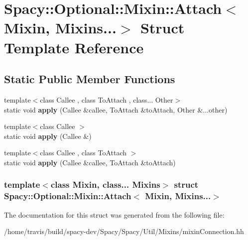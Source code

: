\hypertarget{structSpacy_1_1Optional_1_1Mixin_1_1Attach_3_01Mixin_00_01Mixins_8_8_8_4}{\section{\-Spacy\-:\-:\-Optional\-:\-:\-Mixin\-:\-:\-Attach$<$ \-Mixin, \-Mixins...$>$ \-Struct \-Template \-Reference}
\label{structSpacy_1_1Optional_1_1Mixin_1_1Attach_3_01Mixin_00_01Mixins_8_8_8_4}
}
\subsection*{\-Static \-Public \-Member \-Functions}
\begin{DoxyCompactItemize}
\item 
\hypertarget{structSpacy_1_1Optional_1_1Mixin_1_1Attach_3_01Mixin_00_01Mixins_8_8_8_4_ad894bb9d5fba81bdc5ee4b92b2bd3ea2}{{\footnotesize template$<$class Callee , class To\-Attach , class... \-Other$>$ }\\static void {\bfseries apply} (\-Callee \&callee, \-To\-Attach \&to\-Attach, \-Other \&...other)}\label{structSpacy_1_1Optional_1_1Mixin_1_1Attach_3_01Mixin_00_01Mixins_8_8_8_4_ad894bb9d5fba81bdc5ee4b92b2bd3ea2}

\item 
\hypertarget{structSpacy_1_1Optional_1_1Mixin_1_1Attach_3_01Mixin_00_01Mixins_8_8_8_4_aeea135fae70063c50a7be0d29bbc46d5}{{\footnotesize template$<$class Callee $>$ }\\static void {\bfseries apply} (\-Callee \&)}\label{structSpacy_1_1Optional_1_1Mixin_1_1Attach_3_01Mixin_00_01Mixins_8_8_8_4_aeea135fae70063c50a7be0d29bbc46d5}

\item 
\hypertarget{structSpacy_1_1Optional_1_1Mixin_1_1Attach_3_01Mixin_00_01Mixins_8_8_8_4_a9986fd89deea15e2e3d55272bd4ff1f7}{{\footnotesize template$<$class Callee , class To\-Attach $>$ }\\static void {\bfseries apply} (\-Callee \&callee, \-To\-Attach \&to\-Attach)}\label{structSpacy_1_1Optional_1_1Mixin_1_1Attach_3_01Mixin_00_01Mixins_8_8_8_4_a9986fd89deea15e2e3d55272bd4ff1f7}

\end{DoxyCompactItemize}
\subsubsection*{template$<$class Mixin, class... \-Mixins$>$ struct Spacy\-::\-Optional\-::\-Mixin\-::\-Attach$<$ Mixin, Mixins...$>$}



\-The documentation for this struct was generated from the following file\-:\begin{DoxyCompactItemize}
\item 
/home/travis/build/spacy-\/dev/\-Spacy/\-Spacy/\-Util/\-Mixins/mixin\-Connection.\-hh\end{DoxyCompactItemize}
